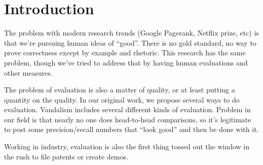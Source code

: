 \section{Introduction}

The problem with modern research trends (Google Pagerank, Netflix
prize, etc) is that we're pursuing human ideas of ``good''.
There is no gold standard, no way to prove correctness except
by example and rhetoric.
This research has the same problem, though we've tried to address
that by having human evaluations and other measures.

The problem of evaluation is also a matter of quality, or at least
putting a quantity on the quality.
In our original work, we propose several ways to do evaluation.
Vandalism includes several different kinds of evaluation.
Problem in our field is that nearly no one does head-to-head
comparisons, so it's legitimate to post some precision/recall
numbers that ``look good'' and then be done with it.

Working in industry, evaluation is also the first thing tossed
out the window in the rush to file patents or create demos.

